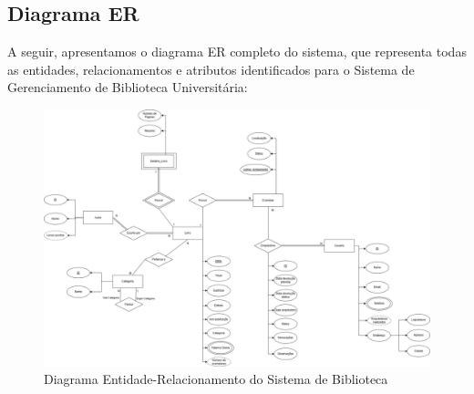 \documentclass[12pt,a4paper]{article}
\begin{document}
\subsection{Diagrama ER}
A seguir, apresentamos o diagrama ER completo do sistema, que representa todas as entidades, relacionamentos e atributos identificados para o Sistema de Gerenciamento de Biblioteca Universitária:

\begin{landscape}
\begin{figure}[]
    \centering
    \includegraphics[width=0.95\linewidth]{ModeloConceitual.png}
    \caption{Diagrama Entidade-Relacionamento do Sistema de Biblioteca}
    \label{fig:diagrama-er}
\end{figure}
\end{landscape}
\end{document}
